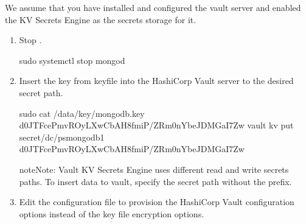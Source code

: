 \documentclass[letterpaper,10pt,english]{sphinxmanual}
\begin{document}
\sphinxAtStartPar
We assume that you have installed and configured the vault server and enabled the KV Secrets Engine as the secrets storage for it.
\begin{enumerate}
%
\item {} 
\sphinxAtStartPar
Stop .

\begin{sphinxVerbatim}[commandchars=\\\{\}]
\PYGZdl{} sudo systemctl stop mongod
\end{sphinxVerbatim}

\item {} 
\sphinxAtStartPar
Insert the key from keyfile into the HashiCorp Vault server to the desired secret
path.

\begin{sphinxVerbatim}[commandchars=\\\{\}]
\PYGZdl{} sudo cat /data/key/mongodb.key
d0JTFcePmvROyLXwCbAH8fmiP/ZRm0nYbeJDMGaI7Zw
\PYGZdl{} vault kv put secret/dc/psmongodb1 d0JTFcePmvROyLXwCbAH8fmiP/ZRm0nYbeJDMGaI7Zw
\end{sphinxVerbatim}

\begin{sphinxadmonition}{note}{Note:}
\sphinxAtStartPar
Vault KV Secrets Engine uses different read and write secrets paths. To insert data to vault, specify the secret path without the  prefix.
\end{sphinxadmonition}

\item {} 
\sphinxAtStartPar
Edit the configuration file to provision the HashiCorp Vault configuration options instead of the key file encryption options.

\begin{sphinxVerbatim}[commandchars=\\\{\}]
\end{sphinxVerbatim}


\end{enumerate}
\end{document}
